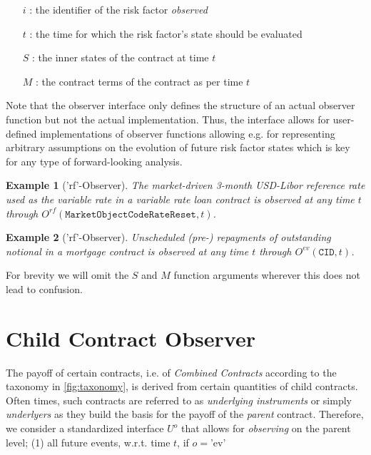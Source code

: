 \documentclass[9pt,oneside]{amsart}
\newtheorem{example}{Example}
\newcommand{\attr}[1]{\texttt{#1}}
\newcommand{\obs}[3]{O^{#1}(#2,#3)}
\newcommand{\cldfunc}[1]{U^{#1}}
\begin{document}
\begin{multicols}{2}
\begin{itemize}
	\item[$i$]: the identifier of the risk factor \textit{observed}

	\item[$t$]: the time for which the risk factor’s state should be evaluated

	\item [$S$]: the inner states of the contract at time $t$

	\item [$M$]: the contract terms of the contract as per time $t$
\end{itemize}

Note that the observer interface only defines the structure of an actual observer function but not the actual implementation. Thus, the interface allows for user-defined implementations of observer functions allowing e.g. for representing arbitrary assumptions on the evolution of future risk factor states which is key for any type of forward-looking analysis.

\begin{example}['rf'-Observer] The market-driven 3-month USD-Libor reference rate used as the variable rate in a variable rate loan contract is observed at any time $t$ through $\obs{rf}{\attr{MarketObjectCodeRateReset}}{t}$.
\end{example}

\begin{example}['rf'-Observer] Unscheduled (pre-) repayments of outstanding notional in a mortgage contract is observed at any time $t$ through $\obs{ev}{\attr{CID}}{t}$.
\end{example}

For brevity we will omit the $S$ and $M$ function arguments wherever this does not lead to confusion.




\section{Child Contract Observer}\label{cldobs}

The payoff of certain contracts, i.e. of \textit{Combined Contracts} according to the taxonomy in \ref{fig:taxonomy}, is derived from certain quantities of child contracts. Often times, such contracts are referred to as \textit{underlying instruments} or simply \textit{underlyers} as they build the basis for the payoff of the \textit{parent} contract. Therefore, we consider a standardized interface $\cldfunc{o}$ that allows for \textit{observing} on the parent level; (1) all future events, w.r.t. time $t$, if $o=$'ev'


\end{multicols}
\end{document}
